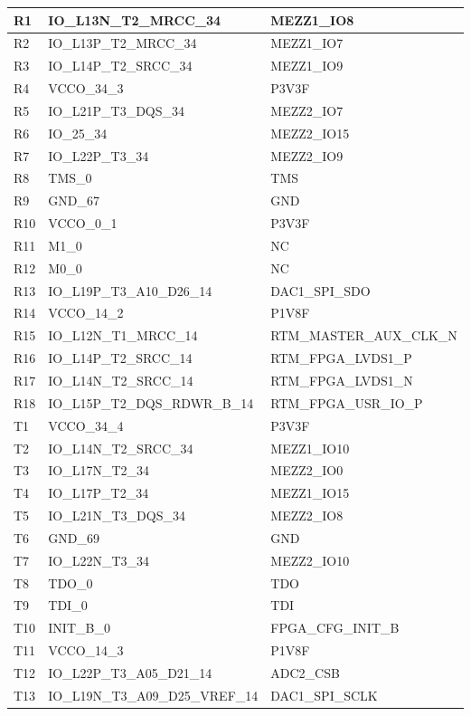 \begin{footnotesize}
\begin{longtable}{|l|p{6cm}|p{6cm}|}
R1	&	IO\_L13N\_T2\_MRCC\_34	&	MEZZ1\_IO8	\\ \hline
R2	&	IO\_L13P\_T2\_MRCC\_34	&	MEZZ1\_IO7	\\ \hline
R3	&	IO\_L14P\_T2\_SRCC\_34	&	MEZZ1\_IO9	\\ \hline
R4	&	VCCO\_34\_3	&	P3V3F	\\ \hline
R5	&	IO\_L21P\_T3\_DQS\_34	&	MEZZ2\_IO7	\\ \hline
R6	&	IO\_25\_34	&	MEZZ2\_IO15	\\ \hline
R7	&	IO\_L22P\_T3\_34	&	MEZZ2\_IO9	\\ \hline
R8	&	TMS\_0	&	TMS	\\ \hline
R9	&	GND\_67	&	GND	\\ \hline
R10	&	VCCO\_0\_1	&	P3V3F	\\ \hline
R11	&	M1\_0	&	NC	\\ \hline
R12	&	M0\_0	&	NC	\\ \hline
R13	&	IO\_L19P\_T3\_A10\_D26\_14	&	DAC1\_SPI\_SDO	\\ \hline
R14	&	VCCO\_14\_2	&	P1V8F	\\ \hline
R15	&	IO\_L12N\_T1\_MRCC\_14	&	RTM\_MASTER\_AUX\_CLK\_N	\\ \hline
R16	&	IO\_L14P\_T2\_SRCC\_14	&	RTM\_FPGA\_LVDS1\_P	\\ \hline
R17	&	IO\_L14N\_T2\_SRCC\_14	&	RTM\_FPGA\_LVDS1\_N	\\ \hline
R18	&	IO\_L15P\_T2\_DQS\_RDWR\_B\_14	&	RTM\_FPGA\_USR\_IO\_P	\\ \hline
T1	&	VCCO\_34\_4	&	P3V3F	\\ \hline
T2	&	IO\_L14N\_T2\_SRCC\_34	&	MEZZ1\_IO10	\\ \hline
T3	&	IO\_L17N\_T2\_34	&	MEZZ2\_IO0	\\ \hline
T4	&	IO\_L17P\_T2\_34	&	MEZZ1\_IO15	\\ \hline
T5	&	IO\_L21N\_T3\_DQS\_34	&	MEZZ2\_IO8	\\ \hline
T6	&	GND\_69	&	GND	\\ \hline
T7	&	IO\_L22N\_T3\_34	&	MEZZ2\_IO10	\\ \hline
T8	&	TDO\_0	&	TDO	\\ \hline
T9	&	TDI\_0	&	TDI	\\ \hline
T10	&	INIT\_B\_0	&	FPGA\_CFG\_INIT\_B	\\ \hline
T11	&	VCCO\_14\_3	&	P1V8F	\\ \hline
T12	&	IO\_L22P\_T3\_A05\_D21\_14	&	ADC2\_CSB	\\ \hline
T13	&	IO\_L19N\_T3\_A09\_D25\_VREF\_14	&	DAC1\_SPI\_SCLK	\\ \hline

\end{longtable}
\end{footnotesize}
